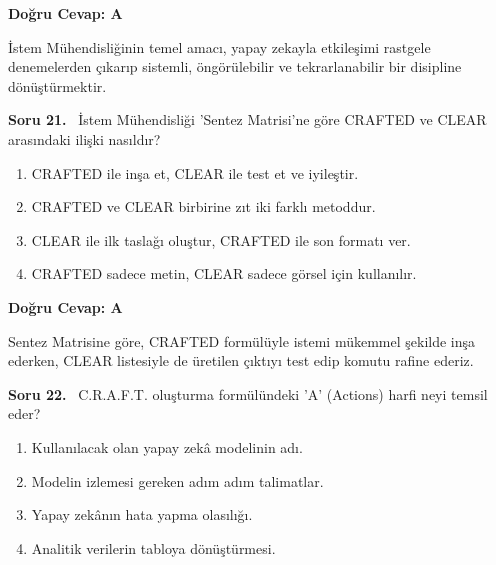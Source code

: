 \documentclass[11pt,a4paper,openany]{book}
\begin{document}
\vspace{4pt}
\begin{tcolorbox}[title=Cevap ve Açıklama, colback=gray!3!white, colframe=primarycolor!90!black, arc=2mm, fonttitle=\bfseries\sffamily, top=6pt, bottom=6pt]
    \textbf{Doğru Cevap: A}

    \vspace{2pt}
    İstem Mühendisliğinin temel amacı, yapay zekayla etkileşimi rastgele denemelerden çıkarıp sistemli, öngörülebilir ve tekrarlanabilir bir disipline dönüştürmektir.
\end{tcolorbox}
\vspace{10pt}
\needspace{5cm}
\vspace{8pt}
\noindent\textbf{\large\sffamily Soru 21.} \ İstem Mühendisliği 'Sentez Matrisi'ne göre CRAFTED ve CLEAR arasındaki ilişki nasıldır?

\begin{enumerate}[label=\Alph*), leftmargin=25pt, topsep=4pt, itemsep=2pt]
        \item CRAFTED ile inşa et, CLEAR ile test et ve iyileştir.
        \item CRAFTED ve CLEAR birbirine zıt iki farklı metoddur.
        \item CLEAR ile ilk taslağı oluştur, CRAFTED ile son formatı ver.
        \item CRAFTED sadece metin, CLEAR sadece görsel için kullanılır.
\end{enumerate}

\vspace{4pt}
\begin{tcolorbox}[title=Cevap ve Açıklama, colback=gray!3!white, colframe=primarycolor!90!black, arc=2mm, fonttitle=\bfseries\sffamily, top=6pt, bottom=6pt]
    \textbf{Doğru Cevap: A}

    \vspace{2pt}
    Sentez Matrisine göre, CRAFTED formülüyle istemi mükemmel şekilde inşa ederken, CLEAR listesiyle de üretilen çıktıyı test edip komutu rafine ederiz.
\end{tcolorbox}
\vspace{10pt}
\needspace{5cm}
\vspace{8pt}
\noindent\textbf{\large\sffamily Soru 22.} \ C.R.A.F.T. oluşturma formülündeki 'A' (Actions) harfi neyi temsil eder?

\begin{enumerate}[label=\Alph*), leftmargin=25pt, topsep=4pt, itemsep=2pt]
        \item Kullanılacak olan yapay zekâ modelinin adı.
        \item Modelin izlemesi gereken adım adım talimatlar.
        \item Yapay zekânın hata yapma olasılığı.
        \item Analitik verilerin tabloya dönüştürmesi.
\end{enumerate}
\end{document}
